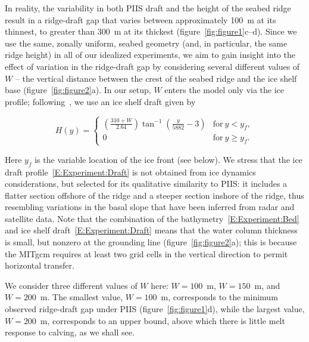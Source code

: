 \documentclass[draft]{agujournal2019}
\begin{document}
In reality, the variability in both PIIS draft and the height of the seabed ridge result in a ridge-draft gap that varies between approximately 100 m at its thinnest, to greater than 300 m at its thickest (figure~\ref{fig:figure1}c--d). Since we use the same, zonally uniform, seabed geometry (and, in particular, the same ridge height) in all of our idealized experiments, we aim to gain insight into the effect of variation in the ridge-draft gap by considering several different values of $W$ -- the vertical distance between the crest of the seabed ridge and the ice shelf base (figure~\ref{fig:figure2}a). In our setup, $W$ enters the model only via the ice profile; following~, we use an ice shelf draft given by
\begin{linenomath*}
\begin{equation}\label{E:Experiment:Draft}
    H(y) = \begin{cases}
    \left(\frac{310 + W}{2.64}\right)\tan^{-1}\left(\frac{y}{5882} -3\right) & \text{for}~y < y_f,\\
    0  & \text{for}~y \geq y_f.
    \end{cases}
\end{equation}
\end{linenomath*}
Here $y_f$ is the variable location of the ice front (see below). We stress that the ice draft profile~\eqref{E:Experiment:Draft} is not obtained from ice dynamics considerations, but selected for its qualitative similarity to PIIS: it includes a flatter section offshore of the ridge and a steeper section inshore of the ridge, thus resembling variations in the basal slope that have been inferred from radar and satellite data. Note that the combination of the bathymetry~\eqref{E:Experiment:Bed} and ice shelf draft~\eqref{E:Experiment:Draft} means that the water column thickness is small, but nonzero at the grounding line (figure~\ref{fig:figure2}a); this is because the MITgcm requires at least two grid cells in the vertical direction to permit horizontal transfer.

We consider three different values of $W$ here: $W=100$~m, $W=150$~m, and $W=200$~m. The smallest value, $W=100$~m, corresponds to the minimum observed ridge-draft gap under PIIS (figure~\ref{fig:figure1}d), while the largest value, $W=200$~m, corresponds to an upper bound, above which there is little melt response to calving, as we shall see.
\end{document}

